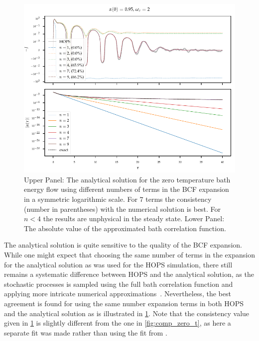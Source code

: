 \begin{figure}[htp]
  \centering
  \includegraphics{figs/analytic_comp/analytical_terms_important.pdf}
  \caption{\label{fig:analytical_terms_important} Upper Panel: The
    analytical solution for the zero temperature bath energy flow
    using different numbers of terms in the BCF expansion in a
    symmetric logarithmic scale. For \(7\) terms the consistency
    (number in parentheses) with the numerical solution is best. For
    \(n<4\) the results are unphysical in the steady state.  Lower
    Panel: The absolute value of the approximated bath correlation
    function.}
\end{figure}

The analytical solution is quite sensitive to the quality of the BCF
expansion.  While one might expect that choosing the same number of
terms in the expansion for the analytical solution as was used for the
HOPS simulation, there still remains a systematic difference between
HOPS and the analytical solution, as the stochastic processes is
sampled using the full bath correlation function and applying more
intricate numerical approximations~\cite{RichardDiss}.  Nevertheless,
the best agreement is found for using the same number expansion terms
in both HOPS and the analytical solution as is illustrated in
\cref{fig:analytical_terms_important}. Note that the consistency value
given in \cref{fig:analytical_terms_important} is slightly different
from the one in \cref{fig:comp_zero_t}, as here a separate fit was
made rather than using the fit from \cite{RichardDiss}.

